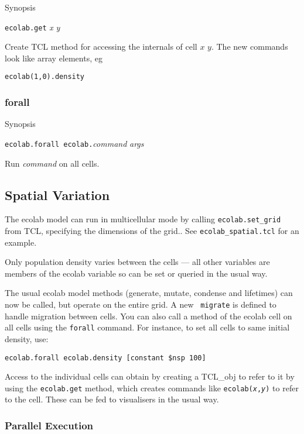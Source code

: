 Synopsis

{\tt ecolab.get} {\em x} {\em y}

\noindent Create TCL method for accessing the internals of cell $x$
$y$. The new commands look like array elements, eg
\begin{verbatim}
ecolab(1,0).density
\end{verbatim}

\subsubsection{forall}

Synopsis

{\tt ecolab.forall ecolab.}{\em command} {\em args}

Run {\em command} on all cells.

\subsection{Spatial Variation}\label{spatial}

The ecolab model can run in multicellular mode by calling
\verb+ecolab.set_grid+ from TCL, specifying the dimensions of the
grid.. See
\verb+ecolab_spatial.tcl+ for an example.

Only population density varies between the cells --- all other
variables are members of the ecolab variable so can be set or queried
in the usual way.

The usual ecolab model methods (generate, mutate, condense and
lifetimes)
can now be called, but operate on the entire grid. A new {\tt
migrate} is defined to handle migration between
cells. You can also call a method of the ecolab cell on all cells
using the \verb+forall+ command. For instance, to set
all cells to same initial density, use:
\begin{verbatim}
ecolab.forall ecolab.density [constant $nsp 100]
\end{verbatim}

Access to the individual cells can obtain by creating a TCL\_obj to
refer to it by using the \verb+ecolab.get+ method, which
creates commands like {\tt ecolab({\em x},{\em y})} to refer to the
cell. These can be fed to visualisers in the usual way.

\subsubsection{Parallel Execution}

